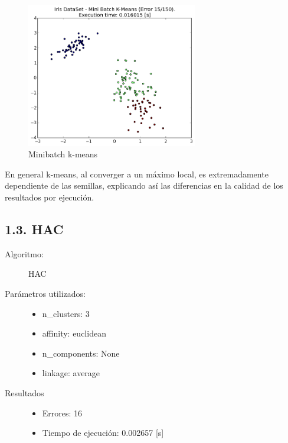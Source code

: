 \documentclass{article}
\begin{document}
\begin{figure}[H]
  \centering
  \includegraphics[width=0.666\textwidth]{img/MiniBatchK-Means.png}
  \caption{Minibatch k-means}
\end{figure}

En general k-means, al converger a un máximo local, es extremadamente dependiente de las semillas, explicando así las diferencias en la calidad de los resultados por ejecución.
\newpage



\subsection*{1.3. \; HAC}
\begin{description}
  \item[Algoritmo:] HAC
  \item[Parámetros utilizados:] \hfill
    \begin{itemize}
      \item n\_clusters: 3
      \item affinity: euclidean
      \item n\_components: None
      \item linkage: average
    \end{itemize}
  \item[Resultados]\hfill
    \begin{itemize}
      \item Errores: 16
      \item Tiempo de ejecución: 0.002657 [s]
    \end{itemize}
\end{description}
\end{document}
